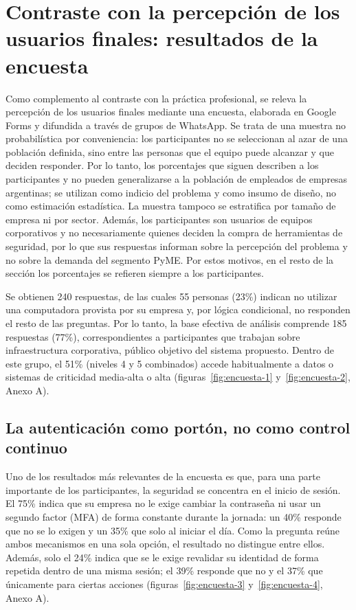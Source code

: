 \section{Contraste con la percepción de los usuarios finales: resultados de la encuesta}
\label{sec:encuesta-usuarios}

Como complemento al contraste con la práctica profesional, se releva la percepción de los usuarios finales mediante una encuesta, elaborada en Google Forms y difundida a través de grupos de WhatsApp. Se trata de una muestra no probabilística por
conveniencia: los participantes no se seleccionan al azar de una población definida, sino entre las
personas que el equipo puede alcanzar y que deciden responder. Por lo tanto, los porcentajes que
siguen describen a los participantes y no pueden generalizarse a la población de empleados de
empresas argentinas; se utilizan como indicio del problema y como insumo de diseño, no como
estimación estadística. La muestra tampoco se estratifica por tamaño de empresa ni por sector. Además, los participantes son usuarios de equipos corporativos y no necesariamente quienes deciden la compra de herramientas de seguridad, por lo que sus respuestas informan sobre la percepción del problema y no sobre la demanda del segmento PyME. Por estos motivos, en el resto de la sección los porcentajes se refieren siempre a los participantes.

Se obtienen 240 respuestas, de las cuales 55 personas (23\%) indican no utilizar una computadora provista por su empresa y, por lógica condicional, no responden el resto de las preguntas. Por lo tanto, la base efectiva de análisis comprende 185 respuestas (77\%), correspondientes a participantes que trabajan sobre infraestructura corporativa, público objetivo del sistema propuesto. Dentro de este grupo, el 51\% (niveles 4 y 5 combinados) accede habitualmente a datos o sistemas de criticidad media-alta o alta (figuras~\ref{fig:encuesta-1} y~\ref{fig:encuesta-2}, Anexo A).

\subsection{La autenticación como portón, no como control continuo}

Uno de los resultados más relevantes de la encuesta es que, para una parte importante de los participantes, la seguridad se concentra en el inicio de sesión. El 75\% indica que su empresa no le exige cambiar la contraseña ni usar un segundo factor (MFA) de forma constante durante la jornada: un 40\% responde que no se lo exigen y un 35\% que solo al iniciar el día. Como la pregunta reúne ambos mecanismos en una sola opción, el resultado no distingue entre ellos. Además, solo el 24\% indica que se le exige revalidar su identidad de forma repetida dentro de una misma sesión; el 39\% responde que no y el 37\% que únicamente para ciertas acciones (figuras~\ref{fig:encuesta-3} y~\ref{fig:encuesta-4}, Anexo A).

